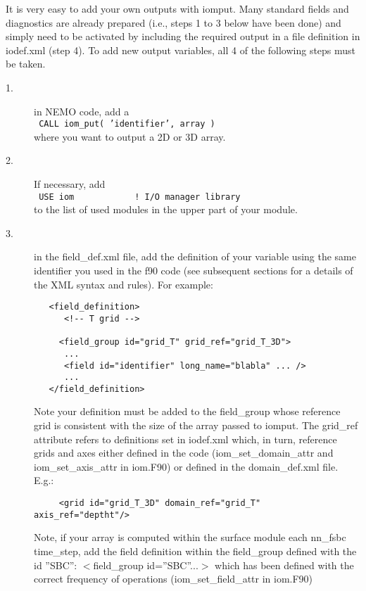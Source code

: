 \documentclass[NEMO_book]{subfiles}
\begin{document}
It is very easy to add your own outputs with iomput. Many standard fields and diagnostics are already prepared (i.e., steps 1 to 3 below have been done) and simply need to be activated by including the required output in a file definition in iodef.xml (step 4). To add new output variables, all 4 of the following steps must be taken.
\begin{description}
\item[1.] in NEMO code, add a \\
\texttt{      CALL iom\_put( 'identifier', array ) } \\
where you want to output a 2D or 3D array.

\item[2.] If necessary, add \\
\texttt{   USE iom\ \ \ \ \ \ \ \ \ \ \ \ ! I/O manager library }  \\
to the list of used modules in the upper part of your module. 

\item[3.] in the field\_def.xml file, add the definition of your variable using the same identifier you used in the f90 code (see subsequent sections for a details of the XML syntax and rules). For example:
\vspace{-20pt}
\begin{alltt}  {{\scriptsize
\begin{verbatim}
   <field_definition>
      <!-- T grid -->

     <field_group id="grid_T" grid_ref="grid_T_3D">
      ...
      <field id="identifier" long_name="blabla" ... />   
      ...
   </field_definition> 
\end{verbatim}
}}\end{alltt} 
Note your definition must be added to the field\_group whose reference grid is consistent with the size of the array passed to iomput. The grid\_ref attribute refers to definitions set in iodef.xml which, in turn, reference grids and axes either defined in the code (iom\_set\_domain\_attr and iom\_set\_axis\_attr in iom.F90) or defined in the domain\_def.xml file. E.g.:
\vspace{-20pt}
\begin{alltt}  {{\scriptsize
\begin{verbatim}
     <grid id="grid_T_3D" domain_ref="grid_T" axis_ref="deptht"/>
\end{verbatim}
}}\end{alltt} 
Note, if your array is computed within the surface module each nn\_fsbc time\_step, 
add the field definition within the field\_group defined with the id ''SBC'': $<$field\_group id=''SBC''...$>$ which has been defined with the correct frequency of operations (iom\_set\_field\_attr in iom.F90)


\end{description}
\end{document}

